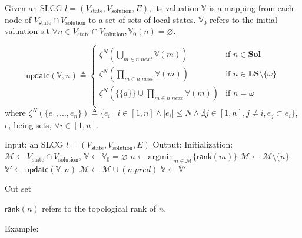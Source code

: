 \begin{definition}[Valuation]\label{def:valuation}
Given an SLCG $l= (V_{\mathrm{state}},V_{\mathrm{solution}},E)$, its valuation $\mathbb{V}$ is a mapping from each node of $V_{\mathrm{state}}\cap V_{\mathrm{solution}}$ to a set of sets of local states.
$\mathbb{V}_0$ refers to the initial valuation s.t $\forall n \in V_{\mathrm{state}}\cap V_{\mathrm{solution}}, \mathbb{V}_0(n)=\varnothing$.
\end{definition}


\begin{definition}
\begin{equation}  
\mathsf{update}(\mathbb{V},n)\triangleq 
      \begin{cases}
            \zeta^N(\bigcup_{m\in n.next}\mathbb{V}(m))&\text{if } n\in\mathbf{Sol}\\
            \zeta^N(\prod_{m\in n.next}\mathbb{V}(m))&\text{if } n\in\mathbf{LS}\setminus\{\omega\}\\
            \zeta^N(\{\{a\}\}\cup\prod_{m\in n.next}\mathbb{V}(m))&\text{if }n=\omega\\
      \end{cases}
\end{equation}
where $\zeta^N(\{e_1,\ldots,e_n\})\triangleq\{e_i\mid i\in[1,n]\land |e_i|\leq N\land\nexists j\in[1,n],j\neq i,e_j\subset e_i\}$, $e_i$ being sets, $\forall i\in[1,n]$.
\end{definition}

\begin{algorithm}[ht]
\begin{algorithmic}
\State Input: an SLCG $l= (V_{\mathrm{state}},V_{\mathrm{solution}},E)$
\State Output: 
\State Initialization: $\mathcal{M}\gets V_{\mathrm{state}}\cap V_{\mathrm{solution}}$, $\mathbb{V}\gets\mathbb{V}_0=\varnothing$
        \State $n\gets\mathrm{argmin}_{m\in\mathcal{M}}\{\mathsf{rank}(m)\}$
		\State $\mathcal{M}\gets\mathcal{M}\setminus\{n\}$
		\State $\mathbb{V}'\gets\mathsf{update}(\mathbb{V},n)$
		    \State $\mathcal{M}\gets\mathcal{M}\cup(n.pred)$
		\EndIf
		\State $\mathbb{V}\gets\mathbb{V}'$
\EndWhile
\State {} 
\end{algorithmic}
\caption{Cut set}\label{alg:cut}
\end{algorithm}

$\mathsf{rank}(n)$ refers to the topological rank of $n$.

Example:

